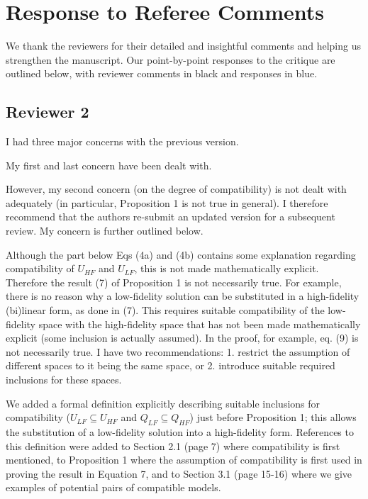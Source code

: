 \documentclass[12pt, letterpaper]{article}
\newcommand{\answer}[1]{\begin{adjustwidth}{1cm}{}{\color{blue}#1}\end{adjustwidth}}
\newcommand{\blue}[1]{{\color{blue}#1}}
\begin{document}
\section*{Response to Referee Comments}

We thank the reviewers for their detailed and insightful comments and helping us strengthen the manuscript. Our point-by-point responses to the critique are outlined below, with reviewer comments in black and \blue{responses in blue}. 


\subsection*{Reviewer 2}

I had three major concerns with the previous version.

My first and last concern have been dealt with.

However, my second concern (on the degree of compatibility) is not dealt with adequately (in particular, Proposition 1 is not true in general). I therefore recommend that the authors re-submit an updated version for a subsequent review. My concern is further outlined below.

Although the part below Eqs (4a) and (4b) contains some explanation regarding compatibility of $U_{HF}$ and $U_{LF}$, this is not made mathematically explicit.
Therefore the result (7) of Proposition 1 is not necessarily true. For example, there is no reason why a low-fidelity solution can be substituted in a high-fidelity (bi)linear form, as done in (7). This requires suitable compatibility of the low-fidelity space with the high-fidelity space that has not been made mathematically explicit (some inclusion is actually assumed). In the proof, for example, eq. (9) is not necessarily true.
I have two recommendations: 1. restrict the assumption of different spaces to it being the same space, or 2. introduce suitable required inclusions for these spaces. 

\answer{We added a formal definition explicitly describing suitable inclusions for compatibility ($U_{LF}\subseteq U_{HF}$ and $Q_{LF}\subseteq Q_{HF}$) just before Proposition 1; this allows the substitution of a low-fidelity solution into a high-fidelity form. References to this definition were added to Section 2.1 (page 7) where compatibility is first mentioned, to Proposition 1 where the assumption of compatibility is first used in proving the result in Equation 7, and to Section 3.1 (page 15-16) where we give examples of potential pairs of compatible models.}
\end{document}
